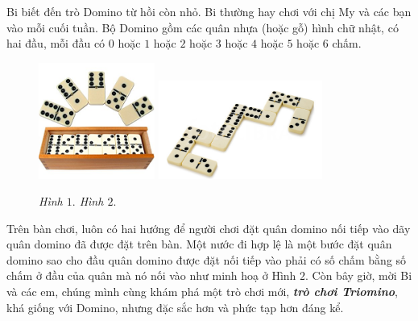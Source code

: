 \newpage
\graphicspath{ {../choicungbi/domino1/} }
\begingroup
{}
\centering
\endgroup
\vspace*{25pt}
	
	Bi biết đến trò Domino từ hồi còn nhỏ. Bi thường hay chơi với chị My và các bạn vào mỗi cuối tuần.
	Bộ Domino gồm các quân nhựa (hoặc gỗ) hình chữ nhật, có hai đầu, mỗi đầu có $0$ hoặc $1$ hoặc $2$ hoặc $3$ hoặc $4$ hoặc $5$ hoặc $6$ chấm.
	\begin{figure}[H]
	\centering
	\vspace*{-10pt}
	\captionsetup{labelformat=empty, justification=centering}
	\includegraphics[width=0.34\textwidth]{dom-01}
	\includegraphics[width=0.48\textwidth]{dom-02}
	\caption{\textit{\small Hình $1.$ \hspace{110pt}Hình $2.$}}
	\vspace*{-15pt}
	\end{figure}
	Trên bàn chơi, luôn có hai hướng để người chơi đặt quân domino nối tiếp vào dãy quân domino đã được đặt trên bàn. Một nước đi hợp lệ là một bước đặt quân domino sao cho đầu quân domino được đặt nối tiếp vào phải có số chấm bằng số chấm ở đầu của quân mà nó nối vào như minh hoạ ở Hình $2$.
	\vskip 0.1cm
	Còn bây giờ, mời Bi và các em, chúng mình cùng khám phá một trò chơi mới, \textit{\textbf{trò chơi Triomino}}, khá giống với Domino, nhưng đặc sắc hơn và phức tạp hơn đáng kể.
